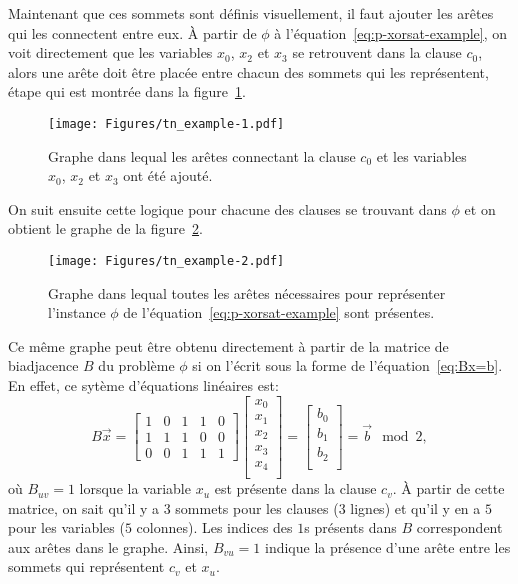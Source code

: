 Maintenant que ces sommets sont définis visuellement, il faut ajouter les arêtes qui les connectent entre eux.
À partir de $\phi$ à l'équation~\ref{eq:p-xorsat-example}, on voit directement que les variables $x_0$, $x_2$ et $x_3$ se retrouvent dans la clause $c_0$, alors une arête doit être placée entre chacun des sommets qui les représentent, étape qui est montrée dans la figure~\ref{fig:tn-example1}.
\begin{figure}[h]
    \centering
    \texttt{[image: Figures/tn\_example-1.pdf]}
    \caption{Graphe dans lequal les arêtes connectant la clause $c_0$ et les variables $x_0$, $x_2$ et $x_3$ ont été ajouté.}
    \label{fig:tn-example1}
\end{figure}
On suit ensuite cette logique pour chacune des clauses se trouvant dans $\phi$ et on obtient le graphe de la figure~\ref{fig:tn-example2}.
\begin{figure}[h]
    \centering
    \texttt{[image: Figures/tn\_example-2.pdf]}
    \caption{Graphe dans lequal toutes les arêtes nécessaires pour représenter l'instance $\phi$ de l'équation~\ref{eq:p-xorsat-example} sont présentes.}
    \label{fig:tn-example2}
\end{figure}
Ce même graphe peut être obtenu directement à partir de la matrice de biadjacence $B$ du problème $\phi$ si on l'écrit sous la forme de l'équation~\ref{eq:Bx=b}.
En effet, ce sytème d'équations linéaires est:
\begin{equation}
    B\vec{x} = \begin{bmatrix}
        1 & 0 & 1 & 1 & 0 \\
        1 & 1 & 1 & 0 & 0 \\
        0 & 0 & 1 & 1 & 1
    \end{bmatrix}\begin{bmatrix}
        x_0\\
        x_1\\
        x_2\\
        x_3\\
        x_4\\
    \end{bmatrix} = \begin{bmatrix}
        b_0\\
        b_1\\
        b_2\\
    \end{bmatrix} = \vec{b} \mod{2},
\end{equation}
où $B_{uv} = 1$ lorsque la variable $x_u$ est présente dans la clause $c_v$.
À partir de cette matrice, on sait qu'il y a $3$ sommets pour les clauses ($3$ lignes) et qu'il y en a $5$ pour les variables ($5$ colonnes).
Les indices des $1$s présents dans $B$ correspondent aux arêtes dans le graphe.
Ainsi, $B_{vu} = 1$ indique la présence d'une arête entre les sommets qui représentent $c_v$ et $x_u$.


